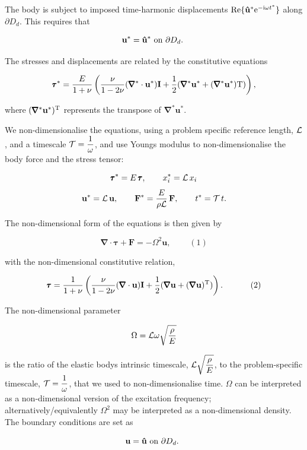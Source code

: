 The body is subject to imposed time-\/harmonic displacements $ {\rm Re}\{\mathbf{\hat{u}}^* {\rm e}^{-{\rm i}\omega t^*}\} $ along $ \partial D_d $. This requires that \begin{center} \[ \mathbf{u}^*=\mathbf{\hat{u}}^*\,\,\textrm{on $ \partial D_d. $ } \] \end{center} 

The stresses and displacements are related by the constitutive equations \begin{center} \[ \pmb{\tau}^*=\frac{E}{1+\nu}\left( \frac{\nu}{1-2\nu}(\pmb{\nabla}^*\cdot\mathbf{u}^*)\textbf{I}+ \frac{1}{2}(\pmb{\nabla}^*\mathbf{u}^*+(\pmb{\nabla}^*\mathbf{u}^*){{\rm T}})\right), \] \end{center}  where $ (\pmb{\nabla}^*\mathbf{u}^*)^{{\rm T}} $ represents the transpose of $ \pmb{\nabla}^*\mathbf{u}^*. $

We non-\/dimensionalise the equations, using a problem specific reference length, $ {\cal L} $, and a timescale $ \displaystyle {\cal T}=\frac{1}{\omega} $, and use Young\textquotesingle{}s modulus to non-\/dimensionalise the body force and the stress tensor\+: \begin{center} \[ \pmb{\tau}^* = E \, \pmb{\tau}, \qquad x_{i}^* = {\cal L}\, x_{i} \] \[ \mathbf{u}^* = {\cal L}\, \mathbf{u}, \qquad \mathbf{F}^* = \frac{E}{\rho \cal L} \, \mathbf{F}, \qquad t^* = {\cal T}\, t. \] \end{center} 

The non-\/dimensional form of the equations is then given by \begin{center} \[ \pmb{\nabla}\cdot\pmb{\tau}+\mathbf{F}=-\Omega^2\mathbf{u}, \ \ \ \ \ \ \ \ \ \ (1) \] \end{center}  with the non-\/dimensional constitutive relation, \begin{center} \[ \pmb{\tau}=\frac{1}{1+\nu}\left( \frac{\nu}{1-2\nu}(\pmb{\nabla}\cdot\mathbf{u})\textbf{I}+ \frac{1}{2}(\pmb{\nabla}\mathbf{u}+(\pmb{\nabla}\mathbf{u})^{{\rm T}})\right). \ \ \ \ \ \ \ \ \ \ (2) \] \end{center}  The non-\/dimensional parameter \begin{center} \[ \Omega = {\cal L}\omega \sqrt{\frac{\rho}{E}} \] \end{center}  is the ratio of the elastic body\textquotesingle{}s intrinsic timescale, $\displaystyle {\cal L} \sqrt{\frac{\rho}{E}}$, to the problem-\/specific timescale, $ \displaystyle {\cal T}=\frac{1}{\omega} $, that we used to non-\/dimensionalise time. $ \Omega $ can be interpreted as a non-\/dimensional version of the excitation frequency; alternatively/equivalently $ \Omega^2 $ may be interpreted as a non-\/dimensional density. The boundary conditions are set as \begin{center} \[ \mathbf{u}=\mathbf{\hat{u}}\,\,\textrm{on $ \partial D_d $. } \] \end{center} 



